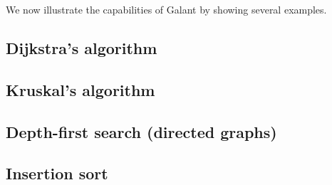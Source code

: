 We now illustrate the capabilities of Galant by showing several examples.

\subsection{Dijkstra's algorithm}



\subsection{Kruskal's algorithm}



\subsection{Depth-first search (directed graphs)}



\subsection{Insertion sort}



